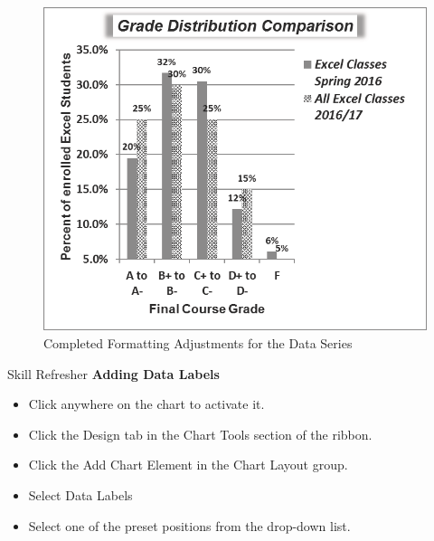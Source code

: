 \begin{figure}[H]
	\centering
	\includegraphics[width=\maxwidth{.95\linewidth}]{gfx/ch04_fig38}
	\caption{Completed Formatting Adjustments for the Data Series}
	\label{04:fig38}
\end{figure}

\begin{center}
	\begin{sklbox}{Skill Refresher}
		\textbf{Adding Data Labels}
		\\
		\begin{itemize}
			\setlength{\itemsep}{0pt}
			\setlength{\parskip}{0pt}
			\setlength{\parsep}{0pt}

			\item Click anywhere on the chart to activate it.
			\item Click the Design tab in the Chart Tools section of the ribbon.
			\item Click the Add Chart Element in the Chart Layout group.
			\item Select Data Labels
			\item Select one of the preset positions from the drop-down list.
			
		\end{itemize}
	\end{sklbox}
\end{center}

